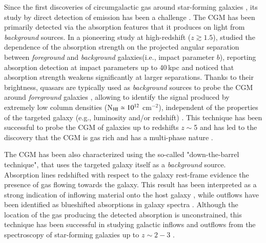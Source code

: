 \documentclass[longauth]{aa}
\begin{document}
Since the first discoveries of circumgalactic gas around star-forming
galaxies \citep{Boksenberg78,Kunth84,Bergeron86}, its study by direct
detection of emission has been a challenge \citep
{vandeVoort13,Burchett21}. The CGM has been primarily detected via the
absorption features that it produces on light from \textit
{background} sources. In a pioneering study at high-redshift
($z\gtrsim 1.5$), 
\cite{Adelberger03,Adelberger05a} studied the dependence of the absorption
strength on the projected angular separation between \textit
{foreground} and \textit{background} galaxies(i.e., impact parameter $b$),
reporting absorption detection at impact parameters up to 40\,kpc and
noticed that absorption strength weakens significantly at larger
separations. Thanks to their brightness, quasars are typically used
as \textit{background} sources to probe the CGM around \textit
{foreground} galaxies
\citep{Bergeron91,Steidel94,Kacprzak10}, allowing to identify the signal
produced by extremely low column densities (N$_{\rm{HI}}\simeq10^{12}$ cm$^
{-2}$), independent of the properties of the targeted galaxy
(e.g.,  luminosity and/or redshift) 
\citep{Tumlinson17,Peroux20a}. This technique has been successful to probe the
CGM of galaxies up to  redshifts $z\sim$5 \citep{Matejek12} and has led to
the discovery that the CGM is gas rich and has a multi-phase nature
\citep
{Adelberger03,Steidel94,Steidel95,Songaila01,Tripp98,Kacprzak10,Werk16}. 

The CGM has been also characterized using the so-called "down-the-barrel
technique", that uses the targeted galaxy itself as a \textit
{background} source. Absorption lines redshifted with respect to the galaxy
rest-frame evidence the presence of gas flowing towards the galaxy. This
result has been interpreted as a strong indication of inflowing material onto
the host galaxy \citep{Sato09,Rubin12,Martin12}, while outflows have been
identified as blueshifted absorptions in galaxy spectra \citep
{Martin05,Chen10}. Although the location of the gas producing the detected
absorption is unconstrained, this technique has been successful in studying
galactic inflows and outflows from the spectroscopy of star-forming galaxies
up to $z\sim2-3$ \citep{Kornei12,Rudie12a,Heckman15,Heckman16}. 
\end{document}
